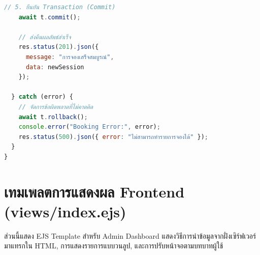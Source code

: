 \begin{lstlisting}[language=JavaScript, caption={Booking Controller พร้อมการตรวจสอบความขัดแย้ง}, label={lst:controller_booking}]
    // 5. ยืนยัน Transaction (Commit)
    await t.commit();
    
    // ส่งคืนผลลัพธ์สำเร็จ
    res.status(201).json({
      message: "การจองเสร็จสมบูรณ์",
      data: newSession
    });

  } catch (error) {
    // จัดการข้อผิดพลาดที่ไม่คาดคิด
    await t.rollback();
    console.error("Booking Error:", error);
    res.status(500).json({ error: "ไม่สามารถทำรายการจองได้" });
  }
}
\end{lstlisting}

\section{เทมเพลตการแสดงผล Frontend (views/index.ejs)}
ส่วนนี้แสดง EJS Template สำหรับ Admin Dashboard แสดงวิธีการนำข้อมูลจากฝั่งเซิร์ฟเวอร์มาแทรกใน HTML, การแสดงรายการแบบวนลูป, และการปรับหน้าจอตามบทบาทผู้ใช้

